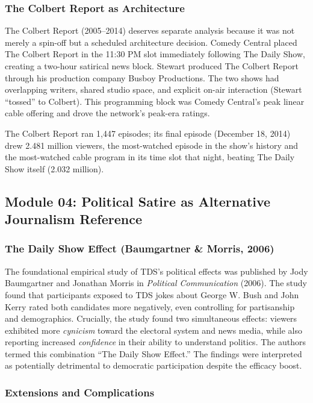 \documentclass[11pt,letterpaper]{article}
\begin{document}
\subsubsection{The Colbert Report as Architecture}

The Colbert Report (2005--2014) deserves separate analysis because it was not merely a spin-off but a scheduled architecture decision. Comedy Central placed The Colbert Report in the 11:30 PM slot immediately following The Daily Show, creating a two-hour satirical news block. Stewart produced The Colbert Report through his production company Busboy Productions. The two shows had overlapping writers, shared studio space, and explicit on-air interaction (Stewart ``tossed'' to Colbert). This programming block was Comedy Central's peak linear cable offering and drove the network's peak-era ratings.

The Colbert Report ran 1,447 episodes; its final episode (December 18, 2014) drew 2.481 million viewers, the most-watched episode in the show's history and the most-watched cable program in its time slot that night, beating The Daily Show itself (2.032 million).

\subsection{Module 04: Political Satire as Alternative Journalism Reference}

\subsubsection{The Daily Show Effect (Baumgartner \& Morris, 2006)}

The foundational empirical study of TDS's political effects was published by Jody Baumgartner and Jonathan Morris in \textit{Political Communication} (2006). The study found that participants exposed to TDS jokes about George W. Bush and John Kerry rated both candidates more negatively, even controlling for partisanship and demographics. Crucially, the study found two simultaneous effects: viewers exhibited more \textit{cynicism} toward the electoral system and news media, while also reporting increased \textit{confidence} in their ability to understand politics. The authors termed this combination ``The Daily Show Effect.'' The findings were interpreted as potentially detrimental to democratic participation despite the efficacy boost.

\subsubsection{Extensions and Complications}
\end{document}
